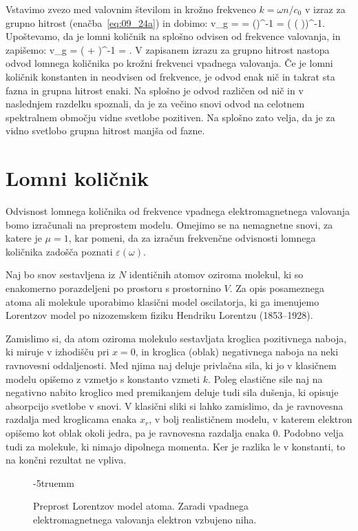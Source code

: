 Vstavimo zvezo med valovnim številom in krožno frekvenco $k=\omega n /c_0$ v izraz za 
grupno hitrost (enačba~\ref{eq:09_24a}) in dobimo:
\beq
v_g =  = \left(\right)^{-1} = \left( \left( 
\right)\!\right)^{-1}\!\!.
\label{eq:09_25}
\eeq
Upoštevamo, da je lomni količnik na splošno odvisen od frekvence valovanja, in zapišemo:
\beq
v_g = \left( + \right)^{-1} = 
.
\label{eq:09_26}
\eeq
V zapisanem izrazu za grupno hitrost nastopa odvod lomnega količnika po krožni frekvenci vpadnega
valovanja. Če je lomni količnik konstanten in neodvisen od frekvence, je odvod enak nič in 
takrat sta fazna in grupna hitrost enaki. Na splošno je odvod različen od nič in v naslednjem razdelku
spoznali, da je za večino snovi odvod na celotnem spektralnem območju vidne svetlobe pozitiven.
Na splošno zato velja, da je za vidno svetlobo grupna hitrost manjša od fazne.

\section{Lomni količnik}
Odvisnost lomnega količnika od frekvence vpadnega 
elektromagnetnega valovanja bomo izračunali na preprostem modelu. 
Omejimo se na nemagnetne snovi, za katere je $\mu = 1$, kar pomeni, da
za izračun frekvenčne odvisnosti lomnega količnika zadošča poznati 
$\varepsilon(\omega)$. 

Naj bo snov sestavljena iz $N$
identičnih atomov oziroma molekul, ki so enakomerno porazdeljeni
po prostoru s prostornino $V$. Za opis posameznega atoma ali molekule uporabimo 
klasični model oscilatorja, ki ga imenujemo Lorentzov model 
po nizozemskem fiziku Hendriku Lorentzu (1853--1928). 

Zamislimo si, da atom oziroma molekulo sestavljata kroglica 
pozitivnega naboja, ki miruje v izhodišču pri $x=0$, in kroglica
(oblak) negativnega naboja na neki ravnovesni oddaljenosti. Med njima naj 
deluje privlačna sila, ki jo v klasičnem modelu opišemo z vzmetjo
s konstanto vzmeti $k$. 
Poleg elastične sile naj na negativno nabito kroglico med 
premikanjem deluje tudi sila dušenja, ki opisuje absorpcijo svetlobe
v snovi. V klasični sliki si lahko
zamislimo, da je ravnovesna razdalja med kroglicama enaka $x_r$, 
v bolj realističnem modelu, v katerem elektron opišemo kot oblak okoli jedra,
pa je ravnovesna razdalja enaka 0. Podobno velja tudi za molekule, ki 
nimajo dipolnega momenta. Ker je razlika le v konstanti, 
to na končni rezultat ne vpliva.
\begin{figure}[ht]
\centering
\def\svgwidth{60truemm} 

\caption{Preprost Lorentzov model atoma. Zaradi vpadnega 
elektromagnetnega valovanja elektron vzbujeno niha.
}
\label{fig:09_Lorentz}
\vglue-5truemm
\end{figure}

